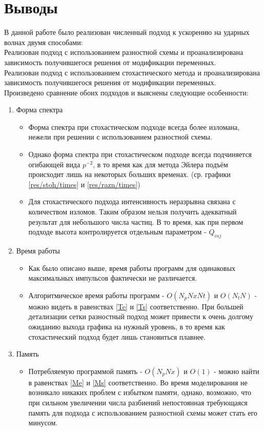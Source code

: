 \documentclass[a4paper,14pt]{extarticle} %
\begin{document}
\section{Выводы}
В данной работе было реализован численный подход к ускорению на ударных волнах двумя способами:\\
Реализован подход с использованием разностной схемы и проанализирована зависимость получившегося решения от модификации переменных.\\
Реализован подход с использованием стохастического метода и проанализирована зависимость получившегося решения от модификации переменных.\\
Произведено сравнение обоих подходов и выяснены следующие особенности:
\begin{enumerate}
\item Форма спектра
\begin{itemize}
\item Форма спектра при стохастическом подходе всегда более изломана, нежели при решении с использованием разностной схемы.
\item Однако форма спектра при стохастическом подходе всегда подчиняется огибающей вида $p^{-2}$, в то время как для метода Эйлера подъём происходит лишь на некоторых больших временах. (ср. графики \ref{res/stoh/times} и \ref{res/razn/times})
\item Для стохастического подхода интенсивность неразрывна связана с количеством изломов. Таким образом нельзя получить адекватный результат для небольшого числа частиц. В то время, как при первом подходе высота контролируется отдельным параметром - $Q_{inj}$
\end{itemize}
\item Время работы
\begin{itemize}
\item Как было описано выше, время работы программ для одинаковых максимальных импульсов фактически не различается.
\item Алгоритмическое время работы программ - $O(N_pNxNt)$ и $O(N_tN)$ - можно видеть в равенствах \ref{Te} и \ref{Ts} соответственно. При большей детализации сетки разностный подход может привести к очень долгому ожиданию выхода графика на нужный уровень, в то время как стохастический подход будет лишь становиться плавнее.
\end{itemize}
\item Память
\begin{itemize}
\item Потребляемую программой память - $O(N_pNx)$ и $O(1)$ - можно найти в равенствах \ref{Me} и \ref{Ms} соответственно. Во время моделирования не возникало никаких проблем с избытком памяти, однако, возможно, что при сильном увеличении числа разбиений непостоянная требующаяся память для подхода с использованием разностной схемы может стать его минусом.

\end{itemize}
\end{enumerate}
\end{document}
